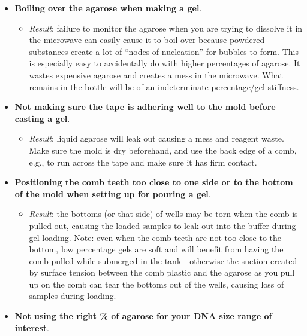 \documentclass[
  letterpaper,
  DIV=11,
  numbers=noendperiod]{scrreprt}
\providecommand{\tightlist}{%
  \setlength{\itemsep}{0pt}\setlength{\parskip}{0pt}}\usepackage{longtable,booktabs,array}
\begin{document}
\begin{itemize}
\item
  \textbf{Boiling over the agarose when making a gel}.

  \begin{itemize}
  \tightlist
  \item
    \emph{Result}: failure to monitor the agarose when you are trying to
    dissolve it in the microwave can easily cause it to boil over
    because powdered substances create a lot of ``nodes of nucleation''
    for bubbles to form. This is especially easy to accidentally do with
    higher percentages of agarose. It wastes expensive agarose and
    creates a mess in the microwave. What remains in the bottle will be
    of an indeterminate percentage/gel stiffness.
  \end{itemize}
\item
  \textbf{Not making sure the tape is adhering well to the mold before
  casting a gel}.

  \begin{itemize}
  \tightlist
  \item
    \emph{Result}: liquid agarose will leak out causing a mess and
    reagent waste. Make sure the mold is dry beforehand, and use the
    back edge of a comb, e.g., to run across the tape and make sure it
    has firm contact.
  \end{itemize}
\item
  \textbf{Positioning the comb teeth too close to one side or to the
  bottom of the mold when setting up for pouring a gel}.

  \begin{itemize}
  \tightlist
  \item
    \emph{Result}: the bottoms (or that side) of wells may be torn when
    the comb is pulled out, causing the loaded samples to leak out into
    the buffer during gel loading. Note: even when the comb teeth are
    not too close to the bottom, low percentage gels are soft and will
    benefit from having the comb pulled while submerged in the tank -
    otherwise the suction created by surface tension between the comb
    plastic and the agarose as you pull up on the comb can tear the
    bottoms out of the wells, causing loss of samples during loading.
  \end{itemize}
\item
  \textbf{Not using the right \% of agarose for your DNA size range of
  interest}.


\end{itemize}
\end{document}
